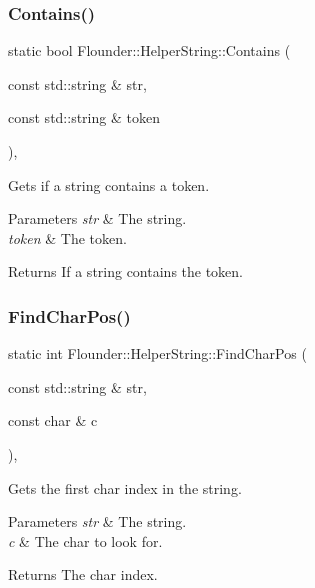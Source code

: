 \subsubsection{\texorpdfstring{Contains()}{Contains()}}
{\footnotesize\ttfamily static bool Flounder\+::\+Helper\+String\+::\+Contains (\begin{DoxyParamCaption}\item[{const std\+::string \&}]{str,  }\item[{const std\+::string \&}]{token }\end{DoxyParamCaption})\hspace{0.3cm}{\ttfamily [inline]}, {\ttfamily [static]}}



Gets if a string contains a token. 


\begin{DoxyParams}{Parameters}
{\em str} & The string. \\
\hline
{\em token} & The token. \\
\hline
\end{DoxyParams}
\begin{DoxyReturn}{Returns}
If a string contains the token. 
\end{DoxyReturn}
\mbox{\label{class_flounder_1_1_helper_string_aac5512766392af54303eb3c2d5ce306b}} 
\subsubsection{\texorpdfstring{Find\+Char\+Pos()}{FindCharPos()}}
{\footnotesize\ttfamily static int Flounder\+::\+Helper\+String\+::\+Find\+Char\+Pos (\begin{DoxyParamCaption}\item[{const std\+::string \&}]{str,  }\item[{const char \&}]{c }\end{DoxyParamCaption})\hspace{0.3cm}{\ttfamily [inline]}, {\ttfamily [static]}}



Gets the first char index in the string. 


\begin{DoxyParams}{Parameters}
{\em str} & The string. \\
\hline
{\em c} & The char to look for. \\
\hline
\end{DoxyParams}
\begin{DoxyReturn}{Returns}
The char index. 
\end{DoxyReturn}
\mbox{\label{class_flounder_1_1_helper_string_ac99aa8b0be04276616d93c53bbba3eca}} 
